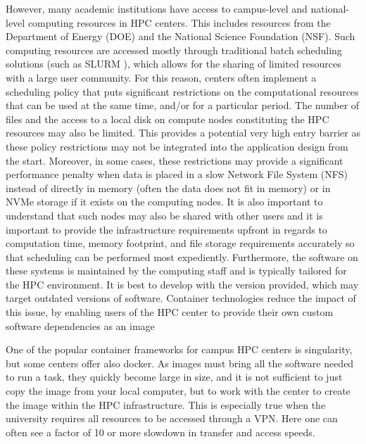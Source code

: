 \documentclass[utf8]{FrontiersinVancouver} %
\begin{document}
However, many academic institutions have access to campus-level and
national-level computing resources in HPC centers.  This includes
resources from the Department of Energy (DOE) and the National Science Foundation (NSF). Such computing resources are accessed
mostly through traditional batch scheduling solutions (such as SLURM
\citep{www-slurm}), which allows
for the sharing of limited resources with a large user community. For this reason, centers often implement a
scheduling policy that puts significant restrictions on the
computational resources that can be used at the same time, and/or for
a particular period. The number of files and the access to a local
disk on compute nodes constituting the HPC resources may also be
limited.  This provides a potential very high entry barrier as these
policy restrictions may not be integrated into the application design
from the start.  Moreover, in some cases, these restrictions may
provide a significant performance penalty when data is placed in a
slow Network File System (NFS) instead of directly in memory (often the data
does not fit in memory) or in NVMe storage if it exists on the
computing nodes.  It is also important to understand
that such nodes may also be shared with other users and it is
important to provide the infrastructure requirements upfront in regards to computation time, memory footprint, and
file storage requirements accurately so that scheduling can be
performed most expediently.  Furthermore, the
software on these systems is maintained by the computing staff and is
typically tailored for the HPC environment.  It is best to develop with the
version provided, which may target outdated versions of software.  Container technologies reduce the impact of this issue, by
enabling users of the HPC center to provide their own custom software dependencies as an image
 

One of the popular container frameworks for campus HPC centers is
singularity, but some centers offer also docker. As images must bring all the software needed to run a task, they quickly become
large in size, and it is not sufficient to just copy the image from your local
computer, but to work with the center to create the image
within the HPC infrastructure. This is especially true when
the university requires all resources to be accessed through a
VPN. Here one can often see a factor of 10 or more slowdown in
transfer and access speeds.
\end{document}
